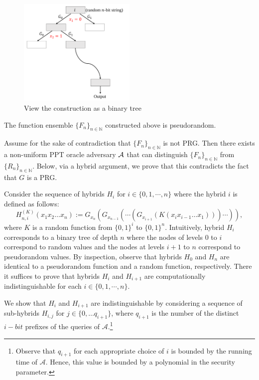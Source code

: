 \begin{figure}[h]
    \centering
    \includegraphics[width=0.5\textwidth]{binary-tree.pdf}
    \caption{View the construction as a binary tree}
    \label{fig:binary-tree}
\end{figure}

\begin{theorem}\label{theorem:ggm}
The function ensemble $\{F_n\}_{n \in \mathbb{N}}$ constructed above is pseudorandom.
\end{theorem}

\proof
Assume for the sake of contradiction that $\{F_n\}_{n \in \mathbb{N}}$ is not PRG.
Then there exists a non-uniform PPT oracle adversary ${\mathcal A}$ that can distinguish $\{F_n\}_{n \in \mathbb{N}}$ from $\{R_n\}_{n \in \mathbb{N}}$. Below, via a hybrid argument, we prove that this contradicts the fact that $G$ is a PRG.

Consider the sequence of hybrids $H_i$ for $i \in \{ 0, 1, \cdots, n\}$ where the hybrid $i$ is defined as follows:
\[H_{n,i}^{(K)} (x_1x_2\ldots x_n ):= G_{x_n}(G_{x_{n-1}} (\cdots(G_{x_{i+1}}(K(x_ix_{i-1}\ldots x_1))) \cdots  )), \]
where $K$ is a random function from $\{0,1\}^{i}$ to $\{0,1\}^n$. Intuitively, hybrid $H_i$ corresponds to a binary tree of depth $n$ where the nodes of levels $0$ to $i$ correspond to random values and the nodes at levels $i+1$ to $n$ correspond to pseudorandom values. By inspection, observe that hybrids $H_0$ and $H_n$ are identical to a pseudorandom function and a random function, respectively. There it suffices to prove that hybrids $H_i$ and $H_{i+1}$ are computationally indistinguishable for each $i \in \{ 0, 1, \cdots, n\}$.

We show that $H_{i}$ and $H_{i+1}$ are indistinguishable by considering a sequence of sub-hybrids $H_{i,j}$ for $j \in \{0,\ldots q_{i+1}\}$, where $q_{i+1}$ is the number of the distinct $i-bit$ prefixes of the queries of $\mathcal{A}$.\footnote{Observe that $q_{i+1}$ for each appropriate choice of $i$ is bounded by the running time of $\mathcal{A}$. Hence, this value is bounded by a polynomial in the security parameter.}

